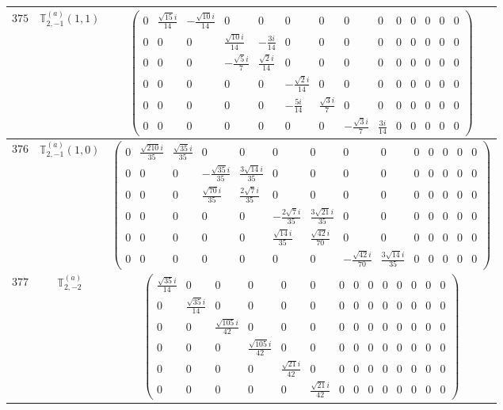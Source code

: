 \documentclass[fleqn,8pt,landscape]{jsarticle}
\begin{document}
\begin{center}
\begin{longtable}{ccc}
$ 375 $ & $ \mathbb{T}_{2,-1}^{(a)}(1,1) $ & $ \begin{pmatrix} 0 & \frac{\sqrt{15} i}{14} & - \frac{\sqrt{10} i}{14} & 0 & 0 & 0 & 0 & 0 & 0 & 0 & 0 & 0 & 0 & 0 \\ 0 & 0 & 0 & \frac{\sqrt{10} i}{14} & - \frac{3 i}{14} & 0 & 0 & 0 & 0 & 0 & 0 & 0 & 0 & 0 \\ 0 & 0 & 0 & - \frac{\sqrt{5} i}{7} & \frac{\sqrt{2} i}{14} & 0 & 0 & 0 & 0 & 0 & 0 & 0 & 0 & 0 \\ 0 & 0 & 0 & 0 & 0 & - \frac{\sqrt{2} i}{14} & 0 & 0 & 0 & 0 & 0 & 0 & 0 & 0 \\ 0 & 0 & 0 & 0 & 0 & - \frac{5 i}{14} & \frac{\sqrt{3} i}{7} & 0 & 0 & 0 & 0 & 0 & 0 & 0 \\ 0 & 0 & 0 & 0 & 0 & 0 & 0 & - \frac{\sqrt{3} i}{7} & \frac{3 i}{14} & 0 & 0 & 0 & 0 & 0 \end{pmatrix} $ \\ \hline
$ 376 $ & $ \mathbb{T}_{2,-1}^{(a)}(1,0) $ & $ \begin{pmatrix} 0 & \frac{\sqrt{210} i}{35} & \frac{\sqrt{35} i}{35} & 0 & 0 & 0 & 0 & 0 & 0 & 0 & 0 & 0 & 0 & 0 \\ 0 & 0 & 0 & - \frac{\sqrt{35} i}{35} & \frac{3 \sqrt{14} i}{35} & 0 & 0 & 0 & 0 & 0 & 0 & 0 & 0 & 0 \\ 0 & 0 & 0 & \frac{\sqrt{70} i}{35} & \frac{2 \sqrt{7} i}{35} & 0 & 0 & 0 & 0 & 0 & 0 & 0 & 0 & 0 \\ 0 & 0 & 0 & 0 & 0 & - \frac{2 \sqrt{7} i}{35} & \frac{3 \sqrt{21} i}{35} & 0 & 0 & 0 & 0 & 0 & 0 & 0 \\ 0 & 0 & 0 & 0 & 0 & \frac{\sqrt{14} i}{35} & \frac{\sqrt{42} i}{70} & 0 & 0 & 0 & 0 & 0 & 0 & 0 \\ 0 & 0 & 0 & 0 & 0 & 0 & 0 & - \frac{\sqrt{42} i}{70} & \frac{3 \sqrt{14} i}{35} & 0 & 0 & 0 & 0 & 0 \end{pmatrix} $ \\ \hline
$ 377 $ & $ \mathbb{T}_{2,-2}^{(a)} $ & $ \begin{pmatrix} \frac{\sqrt{35} i}{14} & 0 & 0 & 0 & 0 & 0 & 0 & 0 & 0 & 0 & 0 & 0 & 0 & 0 \\ 0 & \frac{\sqrt{35} i}{14} & 0 & 0 & 0 & 0 & 0 & 0 & 0 & 0 & 0 & 0 & 0 & 0 \\ 0 & 0 & \frac{\sqrt{105} i}{42} & 0 & 0 & 0 & 0 & 0 & 0 & 0 & 0 & 0 & 0 & 0 \\ 0 & 0 & 0 & \frac{\sqrt{105} i}{42} & 0 & 0 & 0 & 0 & 0 & 0 & 0 & 0 & 0 & 0 \\ 0 & 0 & 0 & 0 & \frac{\sqrt{21} i}{42} & 0 & 0 & 0 & 0 & 0 & 0 & 0 & 0 & 0 \\ 0 & 0 & 0 & 0 & 0 & \frac{\sqrt{21} i}{42} & 0 & 0 & 0 & 0 & 0 & 0 & 0 & 0 \end{pmatrix} $ \\ \hline

\end{longtable}
\end{center}
\end{document}
